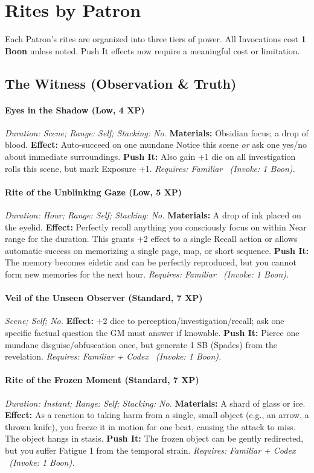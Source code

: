 \section{Rites by Patron}
Each Patron's rites are organized into three tiers of power. All Invocations cost \textbf{1 Boon} unless noted. Push It effects now require a meaningful cost or limitation.

\subsection{The Witness (Observation \& Truth)}
\paragraph{Eyes in the Shadow (Low, 4 XP)} \emph{Duration: Scene; Range: Self; Stacking: No.}
\textbf{Materials:} Obsidian focus; a drop of blood.
\textbf{Effect:} Auto-succeed on one mundane Notice this scene \emph{or} ask one yes/no about immediate surroundings.
\textbf{Push It:} Also gain +1 die on all investigation rolls this scene, but mark Exposure +1.
\emph{Requires: Familiar \ (\textit{Invoke:} 1 Boon).}
\paragraph{Rite of the Unblinking Gaze (Low, 5 XP)} \emph{Duration: Hour; Range: Self; Stacking: No.}
\textbf{Materials:} A drop of ink placed on the eyelid.
\textbf{Effect:} Perfectly recall anything you consciously focus on within Near range for the duration. This grants +2 effect to a single Recall action or allows automatic success on memorizing a single page, map, or short sequence.
\textbf{Push It:} The memory becomes eidetic and can be perfectly reproduced, but you cannot form new memories for the next hour.
\emph{Requires: Familiar \ (\textit{Invoke:} 1 Boon).}
\paragraph{Veil of the Unseen Observer (Standard, 7 XP)} \emph{Scene; Self; No.}
\textbf{Effect:} +2 dice to perception/investigation/recall; ask one specific factual question the GM must answer if knowable.
\textbf{Push It:} Pierce one mundane disguise/obfuscation once, but generate 1 SB (Spades) from the revelation.
\emph{Requires: Familiar + Codex \ (\textit{Invoke:} 1 Boon).}
\paragraph{Rite of the Frozen Moment (Standard, 7 XP)} \emph{Duration: Instant; Range: Self; Stacking: No.}
\textbf{Materials:} A shard of glass or ice.
\textbf{Effect:} As a reaction to taking harm from a single, small object (e.g., an arrow, a thrown knife), you freeze it in motion for one beat, causing the attack to miss. The object hangs in stasis.
\textbf{Push It:} The frozen object can be gently redirected, but you suffer Fatigue 1 from the temporal strain.
\emph{Requires: Familiar + Codex \ (\textit{Invoke:} 1 Boon).}
